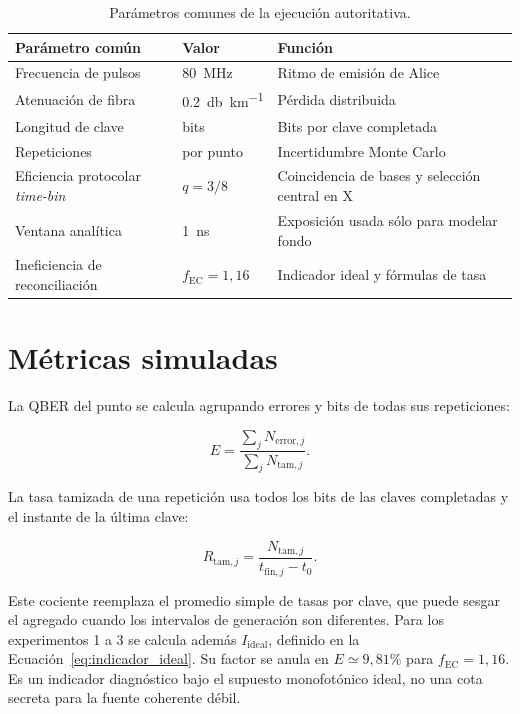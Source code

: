 \begin{table}[htbp]
  \centering
  \begin{tabularx}{\textwidth}{p{}p{}X}
    \toprule
    Parámetro común & Valor & Función \\
    \midrule
    Frecuencia de pulsos & \SI{80}{\mega\hertz} & Ritmo de emisión de Alice \\
    Atenuación de fibra & \SI{0.2}{\decibel\per\kilo\meter} & Pérdida distribuida \\
    Longitud de clave & \PThreeKeyBits{} bits & Bits por clave completada \\
    Repeticiones & \PThreeRepetitions{} por punto & Incertidumbre Monte Carlo \\
    Eficiencia protocolar \textit{time-bin} & \(q=3/8\) & Coincidencia de bases y selección central en X \\
    Ventana analítica & \SI{1}{\nano\second} & Exposición usada sólo para modelar fondo \\
    Ineficiencia de reconciliación & \(f_\mathrm{EC}=1{,}16\) & Indicador ideal y fórmulas de tasa \\
    \bottomrule
  \end{tabularx}
  \caption{Parámetros comunes de la ejecución autoritativa.}
  \label{tab:parametros_base}
\end{table}

\section{Métricas simuladas}

La QBER del punto se calcula agrupando errores y bits de todas sus repeticiones:

\begin{equation}
  E=\frac{\sum_j N_{\mathrm{error},j}}
          {\sum_j N_{\mathrm{tam},j}}.
  \label{eq:qber_agregado}
\end{equation}

La tasa tamizada de una repetición usa todos los bits de las claves completadas y el instante de la última clave:

\begin{equation}
  R_{\mathrm{tam},j}
  =\frac{N_{\mathrm{tam},j}}{t_{\mathrm{fin},j}-t_0}.
  \label{eq:tasa_tamizada}
\end{equation}

Este cociente reemplaza el promedio simple de tasas por clave, que puede sesgar el agregado cuando los intervalos de generación son diferentes. Para los experimentos 1 a 3 se calcula además \(I_\mathrm{ideal}\), definido en la Ecuación~\ref{eq:indicador_ideal}. Su factor se anula en \(E\simeq9{,}81\%\) para \(f_\mathrm{EC}=1{,}16\). Es un indicador diagnóstico bajo el supuesto monofotónico ideal, no una cota secreta para la fuente coherente débil.

